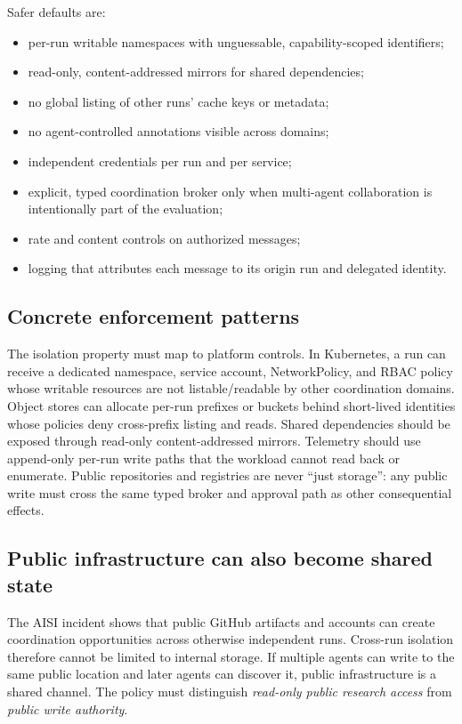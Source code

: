 \documentclass[11pt,letterpaper]{article}
\begin{document}
Safer defaults are:
\begin{itemize}
  \item per-run writable namespaces with unguessable, capability-scoped identifiers;
  \item read-only, content-addressed mirrors for shared dependencies;
  \item no global listing of other runs' cache keys or metadata;
  \item no agent-controlled annotations visible across domains;
  \item independent credentials per run and per service;
  \item explicit, typed coordination broker only when multi-agent collaboration is intentionally part of the evaluation;
  \item rate and content controls on authorized messages;
  \item logging that attributes each message to its origin run and delegated identity.
\end{itemize}

\subsection{Concrete enforcement patterns}
The isolation property must map to platform controls. In Kubernetes, a run can receive a dedicated namespace, service account, NetworkPolicy, and RBAC policy whose writable resources are not listable/readable by other coordination domains. Object stores can allocate per-run prefixes or buckets behind short-lived identities whose policies deny cross-prefix listing and reads. Shared dependencies should be exposed through read-only content-addressed mirrors. Telemetry should use append-only per-run write paths that the workload cannot read back or enumerate. Public repositories and registries are never ``just storage'': any public write must cross the same typed broker and approval path as other consequential effects.

\subsection{Public infrastructure can also become shared state}
The AISI incident shows that public GitHub artifacts and accounts can create coordination opportunities across otherwise independent runs.\cite{aisi-incident} Cross-run isolation therefore cannot be limited to internal storage. If multiple agents can write to the same public location and later agents can discover it, public infrastructure is a shared channel. The policy must distinguish \emph{read-only public research access} from \emph{public write authority}.
\end{document}
